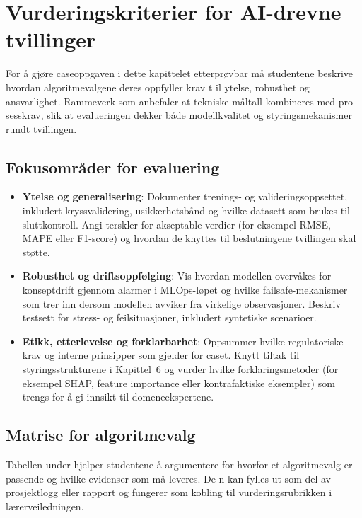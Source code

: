 \section{Vurderingskriterier for AI-drevne tvillinger}
For å gjøre caseoppgaven i dette kapittelet etterprøvbar må studentene beskrive hvordan algoritmevalgene deres oppfyller krav t
il ytelse, robusthet og ansvarlighet. Rammeverk som \citet{ec2020trustworthyai} anbefaler at tekniske måltall kombineres med pro
sesskrav, slik at evalueringen dekker både modellkvalitet og styringsmekanismer rundt tvillingen.

\subsection{Fokusområder for evaluering}
\begin{itemize}
    \item \textbf{Ytelse og generalisering}: Dokumenter trenings- og valideringsoppsettet, inkludert kryssvalidering, usikkerhetsbånd og hvilke datasett som brukes til sluttkontroll. Angi terskler for akseptable verdier (for eksempel RMSE, MAPE eller F1-score) og hvordan de knyttes til beslutningene tvillingen skal støtte.
    \item \textbf{Robusthet og driftsoppfølging}: Vis hvordan modellen overvåkes for konseptdrift gjennom alarmer i MLOps-løpet og hvilke failsafe-mekanismer som trer inn dersom modellen avviker fra virkelige observasjoner. Beskriv testsett for stress- og feilsituasjoner, inkludert syntetiske scenarioer.
    \item \textbf{Etikk, etterlevelse og forklarbarhet}: Oppsummer hvilke regulatoriske krav og interne prinsipper som gjelder for caset. Knytt tiltak til styringsstrukturene i Kapittel~6 og vurder hvilke forklaringsmetoder (for eksempel SHAP, feature importance eller kontrafaktiske eksempler) som trengs for å gi innsikt til domeneekspertene.
\end{itemize}

\subsection{Matrise for algoritmevalg}
Tabellen under hjelper studentene å argumentere for hvorfor et algoritmevalg er passende og hvilke evidenser som må leveres. De
n kan fylles ut som del av prosjektlogg eller rapport og fungerer som kobling til vurderingsrubrikken i lærerveiledningen.

